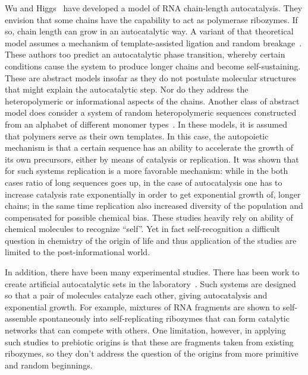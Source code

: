 \documentclass[journal=jacsat,manuscript=article,layout=twocolumn]{achemso}
\begin{document}
Wu and Higgs~\cite{Wu2009} have developed a model of RNA chain-length autocatalysis.  They envision 
that some chains have the capability to act as polymerase ribozymes.  If so, chain length can grow 
in an autocatalytic way.  A variant of that theoretical model assumes a mechanism of 
template-assisted ligation and random breakage~\cite{Tkachenko2014}.  These authors too predict an 
autocatalytic phase transition, whereby certain conditions cause the system to produce longer 
chains and become self-sustaining.  These are abstract models insofar as they do not postulate 
molecular structures that might explain the autocatalytic step.  Nor do they address the 
heteropolymeric or informational aspects of the chains. 
Another class of abstract model does 
consider a system of random heteropolymeric sequences constructed from an alphabet of different 
monomer types~\cite{nowak2008prevolutionary,Ohtsuki2009,Chen2012,Derr2012}.  
In these models, it is 
assumed that polymers serve as their own templates.  In this case, the autopoietic mechanism is 
that a certain sequence has an ability to accelerate the growth of its own precursors, either by 
means of catalysis or replication. It was shown that for such systems replication is a more 
favorable mechanism: while in the both cases ratio of long sequences goes up, in the case 
of autocatalysis one has to increase catalysis rate exponentially in order to get exponential 
growth of, longer chains; in the same time replication also increased diversity of the population 
and compensated for possible chemical bias. These studies heavily rely on ability of chemical 
molecules to recognize ``self''. Yet in fact self-recognition a difficult question in chemistry of 
the origin of life and thus application of the studies are limited to the post-informational world.
 
 In addition, there have been many experimental studies.  There has been work to create artificial 
autocatalytic sets in the laboratory~\cite{VonKiedrowski1986,Lincoln2009,Vaidya2012}. Such systems 
are designed so that a pair of molecules catalyze each other, giving autocatalysis and exponential 
growth.  For example, mixtures of RNA fragments are shown to self-assemble spontaneously into 
self-replicating ribozymes that can form catalytic networks that can compete with others.  One 
limitation, however, in applying such studies to prebiotic origins is that these are fragments 
taken from existing ribozymes, so they don't address the question of the origins from more 
primitive and random beginnings.
 
\end{document}
